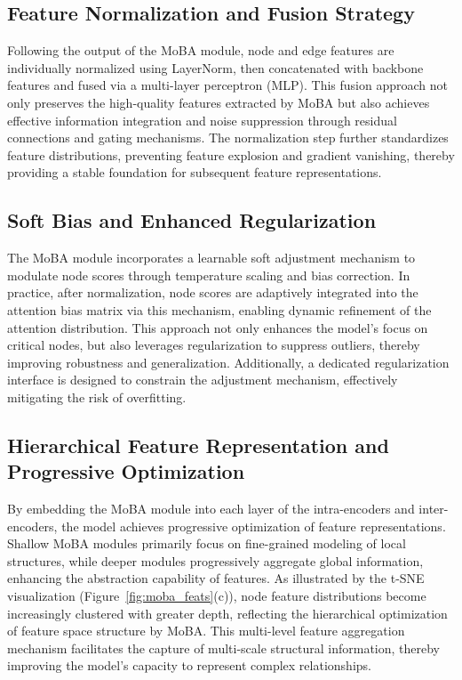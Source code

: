 \documentclass[lettersize,journal]{IEEEtran}
\begin{document}
\subsection{Feature Normalization and Fusion Strategy}
Following the output of the MoBA module, node and edge features are individually normalized using LayerNorm\cite{ba2016layer}, then concatenated with backbone features and fused via a multi-layer perceptron (MLP). This fusion approach not only preserves the high-quality features extracted by MoBA but also achieves effective information integration and noise suppression through residual connections\cite{he2016deep} and gating mechanisms\cite{graves2012long}. The normalization step further standardizes feature distributions, preventing feature explosion and gradient vanishing, thereby providing a stable foundation for subsequent feature representations.

\subsection{Soft Bias and Enhanced Regularization}
The MoBA module incorporates a learnable soft adjustment mechanism to modulate node scores through temperature scaling and bias correction. In practice, after normalization, node scores are adaptively integrated into the attention bias matrix via this mechanism, enabling dynamic refinement of the attention distribution. This approach not only enhances the model's focus on critical nodes, but also leverages regularization to suppress outliers, thereby improving robustness and generalization. Additionally, a dedicated regularization interface is designed to constrain the adjustment mechanism, effectively mitigating the risk of overfitting.

\subsection{Hierarchical Feature Representation and Progressive Optimization}
By embedding the MoBA module into each layer of the intra-encoders and inter-encoders, the model achieves progressive optimization of feature representations. Shallow MoBA modules primarily focus on fine-grained modeling of local structures, while deeper modules progressively aggregate global information, enhancing the abstraction capability of features. As illustrated by the t-SNE visualization (Figure~\ref{fig:moba_feats}(c)), node feature distributions become increasingly clustered with greater depth, reflecting the hierarchical optimization of feature space structure by MoBA. This multi-level feature aggregation mechanism facilitates the capture of multi-scale structural information, thereby improving the model's capacity to represent complex relationships.
\end{document}
